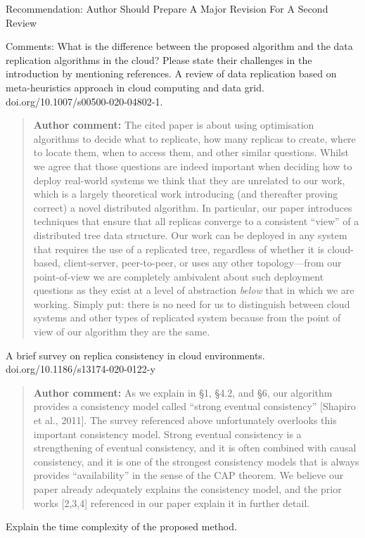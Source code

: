 \documentclass[10pt]{article}
\newcommand{\authorcomment}[1]{\begin{quote}\textbf{Author comment:} #1\end{quote}}
\begin{document}
\begin{spverbatim}
Recommendation: Author Should Prepare A Major Revision For A Second Review

Comments:
What is the difference between the proposed algorithm and the data replication algorithms in the cloud? Please state their challenges in the introduction by mentioning references.
A review of data replication based on meta-heuristics approach in cloud computing and data grid. doi.org/10.1007/s00500-020-04802-1.
\end{spverbatim}
\authorcomment{The cited paper is about using optimisation algorithms to decide what to replicate, how many replicas to create, where to locate them, when to access them, and other similar questions.
Whilst we agree that those questions are indeed important when deciding how to deploy real-world systems we think that they are unrelated to our work, which is a largely theoretical work introducing (and thereafter proving correct) a novel distributed algorithm.
In particular, our paper introduces techniques that ensure that all replicas converge to a consistent ``view'' of a distributed tree data structure.
Our work can be deployed in any system that requires the use of a replicated tree, regardless of whether it is cloud-based, client-server, peer-to-peer, or uses any other topology---from our point-of-view we are completely ambivalent about such deployment questions as they exist at a level of abstraction \emph{below} that in which we are working.
Simply put: there is no need for us to distinguish between cloud systems and other types of replicated system because from the point of view of our algorithm they are the same.}
\begin{spverbatim}
A brief survey on replica consistency in cloud environments. doi.org/10.1186/s13174-020-0122-y
\end{spverbatim}
\authorcomment{As we explain in {\S}1, {\S}4.2, and {\S}6, our algorithm provides a consistency model called ``strong eventual consistency'' [Shapiro et al., 2011].
The survey referenced above unfortunately overlooks this important consistency model.
Strong eventual consistency is a strengthening of eventual consistency, and it is often combined with causal consistency, and it is one of the strongest consistency models that is always provides ``availability'' in the sense of the CAP theorem.
We believe our paper already adequately explains the consistency model, and the prior works [2,3,4] referenced in our paper explain it in further detail.}
\begin{spverbatim}
Explain the time complexity of the proposed method.
\end{spverbatim}
\end{document}
